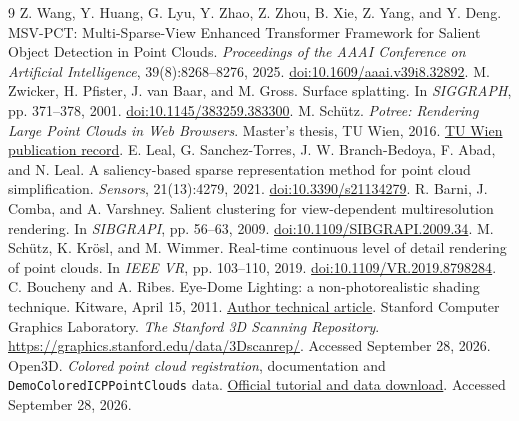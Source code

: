 \documentclass[a4paper]{article}
\begin{document}
\clearpage
\begin{thebibliography}{9}
\small\setlength{\itemsep}{0.25em}
Z. Wang, Y. Huang, G. Lyu, Y. Zhao, Z. Zhou, B. Xie, Z. Yang, and Y. Deng.
MSV-PCT: Multi-Sparse-View Enhanced Transformer Framework for Salient Object Detection in Point Clouds.
\emph{Proceedings of the AAAI Conference on Artificial Intelligence}, 39(8):8268--8276, 2025.
\href{https://doi.org/10.1609/aaai.v39i8.32892}{doi:10.1609/aaai.v39i8.32892}.
M. Zwicker, H. Pfister, J. van Baar, and M. Gross.
Surface splatting. In \emph{SIGGRAPH}, pp. 371--378, 2001.
\href{https://doi.org/10.1145/383259.383300}{doi:10.1145/383259.383300}.
M. Sch\"utz. \emph{Potree: Rendering Large Point Clouds in Web Browsers}.
Master's thesis, TU Wien, 2016.
\href{https://www.cg.tuwien.ac.at/research/publications/2016/SCHUETZ-2016-POT/}{TU Wien publication record}.
E. Leal, G. Sanchez-Torres, J. W. Branch-Bedoya, F. Abad, and N. Leal.
A saliency-based sparse representation method for point cloud simplification.
\emph{Sensors}, 21(13):4279, 2021.
\href{https://doi.org/10.3390/s21134279}{doi:10.3390/s21134279}.
R. Barni, J. Comba, and A. Varshney.
Salient clustering for view-dependent multiresolution rendering.
In \emph{SIBGRAPI}, pp. 56--63, 2009.
\href{https://doi.org/10.1109/SIBGRAPI.2009.34}{doi:10.1109/SIBGRAPI.2009.34}.
M. Sch\"utz, K. Kr\"osl, and M. Wimmer.
Real-time continuous level of detail rendering of point clouds.
In \emph{IEEE VR}, pp. 103--110, 2019.
\href{https://doi.org/10.1109/VR.2019.8798284}{doi:10.1109/VR.2019.8798284}.
C. Boucheny and A. Ribes.
Eye-Dome Lighting: a non-photorealistic shading technique.
Kitware, April 15, 2011.
\href{https://www.kitware.com/eye-dome-lighting-a-non-photorealistic-shading-technique/}{Author technical article}.
Stanford Computer Graphics Laboratory.
\emph{The Stanford 3D Scanning Repository}.
\url{https://graphics.stanford.edu/data/3Dscanrep/}. Accessed September 28, 2026.
Open3D. \emph{Colored point cloud registration}, documentation and
\texttt{DemoColoredICPPointClouds} data.
\href{https://www.open3d.org/docs/release/tutorial/pipelines/colored_pointcloud_registration.html}{Official tutorial and data download}. Accessed September 28, 2026.
\end{thebibliography}
\end{document}
